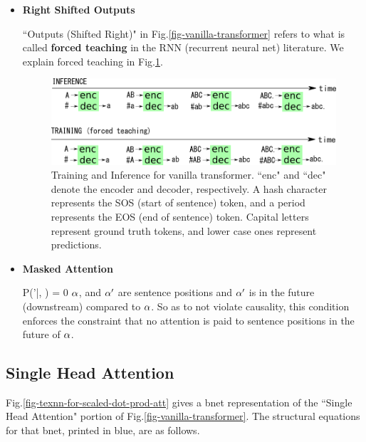 \begin{itemize}
\item{\bf Right Shifted Outputs}

``Outputs (Shifted Right)" in Fig.\ref{fig-vanilla-transformer}
refers to what is called
{\bf forced teaching}
in the RNN (recurrent neural net) 
literature.
We explain forced teaching
in Fig.\ref{fig-transformer-full-3-words-train-test}.


\begin{figure}[!h]
\centering
\includegraphics[width=6in]
{transformer/transformer-train-test.png}
\caption{Training and Inference for vanilla transformer.
``enc" and ``dec" denote
the encoder and decoder, respectively.
A hash character represents the SOS (start of sentence) token,
and a period represents the EOS (end of sentence) token. Capital letters represent ground
truth tokens, and lower case ones represent 
predictions.}
\label{fig-transformer-full-3-words-train-test}
\end{figure}

\item {\bf Masked Attention}

\beq
P(\alp'|\alp, \nu) = 0 \;\;\;
\eeq
$\alpha$, and $\alpha'$ are
sentence positions and $\alpha'$ is in the future (downstream)
compared to $\alpha$.
So as to
not violate causality,
this condition enforces the constraint that no attention is paid to sentence positions in the future of $\alpha$.


%


\end{itemize}

\subsection{Single Head Attention}

Fig.\ref{fig-texnn-for-scaled-dot-prod-att}
gives a
bnet representation of
the ``Single Head Attention"
portion of Fig.\ref{fig-vanilla-transformer}.
The structural equations for that bnet,
printed in blue,
are as follows.
 

